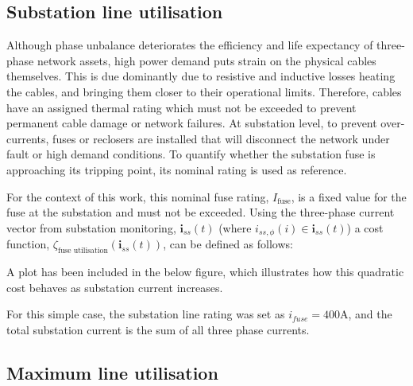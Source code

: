 \subsection{Substation line utilisation}
\label{ch1:subsec:substation-line-utilisation}

Although phase unbalance deteriorates the efficiency and life expectancy of three-phase network assets, high power demand puts strain on the physical cables themselves.
This is due dominantly due to resistive and inductive losses heating the cables, and bringing them closer to their operational limits.
Therefore, cables have an assigned thermal rating which must not be exceeded to prevent permanent cable damage or network failures.
At substation level, to prevent over-currents, fuses or reclosers are installed that will disconnect the network under fault or high demand conditions.
To quantify whether the substation fuse is approaching its tripping point, its nominal rating is used as reference.


For the context of this work, this nominal fuse rating, $I_\text{fuse}$, is a fixed value for the fuse at the substation and must not be exceeded.
Using the three-phase current vector from substation monitoring, $\textbf{i}_{ss}(t)$ (where $i_{ss,\phi}(i) \in \textbf{i}_{ss}(t)$) a cost function, $\zeta_\text{fuse utilisation}(\textbf{i}_{ss}(t))$, can be defined as follows:



A plot has been included in the below figure, which illustrates how this quadratic cost behaves as substation current increases.



For this simple case, the substation line rating was set as $i_{fuse}=400\text{A}$, and the total substation current is the sum of all three phase currents.

\subsection{Maximum line utilisation}
\label{ch1:subsec:maximum-line-utilisation}


